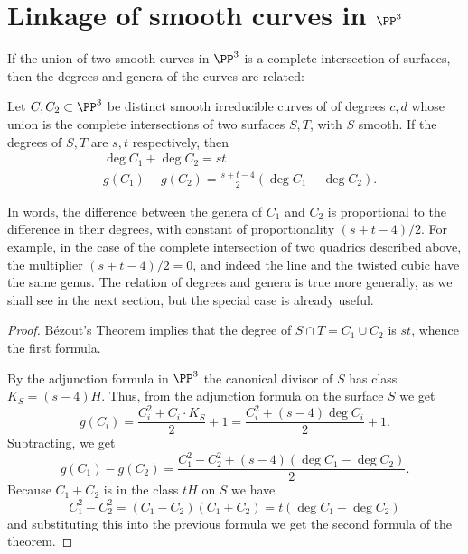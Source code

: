 \section{Linkage of smooth curves in $\PP^3$}\label{SLinkage}\label{linkage section}

If the union of two smooth curves in $\PP^3$ is a complete intersection of surfaces, then the degrees and genera
of the curves are related:

\begin{theorem}\label{liaison genus formula-first version} Let $C, {C_2}\subset \PP^3$ be distinct smooth irreducible curves of  of degrees $c,d$ whose union is the complete intersections of two surfaces $S,T$, with $S$ smooth. If the degrees of $S,T$ are $s,t$ respectively, then
$$
\begin{aligned}
&\deg C_1+\deg C_2 = st\\
&g(C_1) - g({C_2}) = \frac{s+t-4}{2}(\deg C_1-\deg {C_2}).
\end{aligned}
 $$
\end{theorem}
In words, the difference between the genera of $C_1$ and ${C_2}$ is proportional to the difference in their degrees, with constant of proportionality $(s+t-4)/2$. For example, in the case of the complete intersection of two quadrics
described above, the multiplier $(s+t-4)/2 = 0$, and indeed the line and the twisted cubic have the same genus.
The relation of degrees and genera is true more generally, as we shall see in the next section, but the special
case is already useful.

\begin{proof}
B\'ezout's Theorem implies that the degree of $S\cap T = C_1\cup C_2$ is $st$, whence the first formula.

By the adjunction formula in $\PP^3$ the canonical divisor of $S$ has class $K_S = (s-4)H$. Thus, from the 
adjunction formula on the surface $S$ we get
$$
g(C_i) = \frac{C_i^2+C_i\cdot K_S}{2}+1 = \frac{C_i^2+(s-4) \deg C_i}{2}+1.
$$
Subtracting, we get
$$
g(C_1)-g(C_2) = \frac{C_1^2-C_2^2+(s-4) (\deg C_1-\deg C_2)} {2}.
$$
Because $C_1+C_2$ is in the class $tH$ on $S$ we have
$$
C_1^2-C_2^2 = (C_1-C_2)(C_1+C_2) = t(\deg C_1-\deg C_2)
$$
and substituting this into the previous formula we get the second formula of the theorem.
\end{proof}

